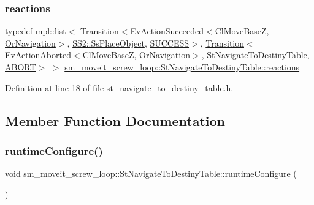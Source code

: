 \subsubsection{\texorpdfstring{reactions}{reactions}}
{\footnotesize\ttfamily typedef mpl\+::list$<$ \hyperlink{classsmacc_1_1Transition}{Transition}$<$\hyperlink{structsmacc_1_1default__events_1_1EvActionSucceeded}{Ev\+Action\+Succeeded}$<$\hyperlink{classcl__move__base__z_1_1ClMoveBaseZ}{Cl\+Move\+BaseZ}, \hyperlink{classsm__moveit__screw__loop_1_1OrNavigation}{Or\+Navigation}$>$, \hyperlink{structsm__moveit__screw__loop_1_1SS2_1_1SsPlaceObject}{S\+S2\+::\+Ss\+Place\+Object}, \hyperlink{structsmacc_1_1default__transition__tags_1_1SUCCESS}{S\+U\+C\+C\+E\+SS}$>$, \hyperlink{classsmacc_1_1Transition}{Transition}$<$\hyperlink{structsmacc_1_1default__events_1_1EvActionAborted}{Ev\+Action\+Aborted}$<$\hyperlink{classcl__move__base__z_1_1ClMoveBaseZ}{Cl\+Move\+BaseZ}, \hyperlink{classsm__moveit__screw__loop_1_1OrNavigation}{Or\+Navigation}$>$, \hyperlink{structsm__moveit__screw__loop_1_1StNavigateToDestinyTable}{St\+Navigate\+To\+Destiny\+Table}, \hyperlink{structsmacc_1_1default__transition__tags_1_1ABORT}{A\+B\+O\+RT}$>$ $>$ \hyperlink{structsm__moveit__screw__loop_1_1StNavigateToDestinyTable_ab2b24433e29ebd167928808ca9dc64b7}{sm\+\_\+moveit\+\_\+screw\+\_\+loop\+::\+St\+Navigate\+To\+Destiny\+Table\+::reactions}}



Definition at line 18 of file st\+\_\+navigate\+\_\+to\+\_\+destiny\+\_\+table.\+h.



\subsection{Member Function Documentation}
\mbox{\label{structsm__moveit__screw__loop_1_1StNavigateToDestinyTable_a41b111a7ea65114c449a5d3f0d8e0750}} 
\subsubsection{\texorpdfstring{runtime\+Configure()}{runtimeConfigure()}}
{\footnotesize\ttfamily void sm\+\_\+moveit\+\_\+screw\+\_\+loop\+::\+St\+Navigate\+To\+Destiny\+Table\+::runtime\+Configure (\begin{DoxyParamCaption}{ }\end{DoxyParamCaption})\hspace{0.3cm}{\ttfamily [inline]}}



